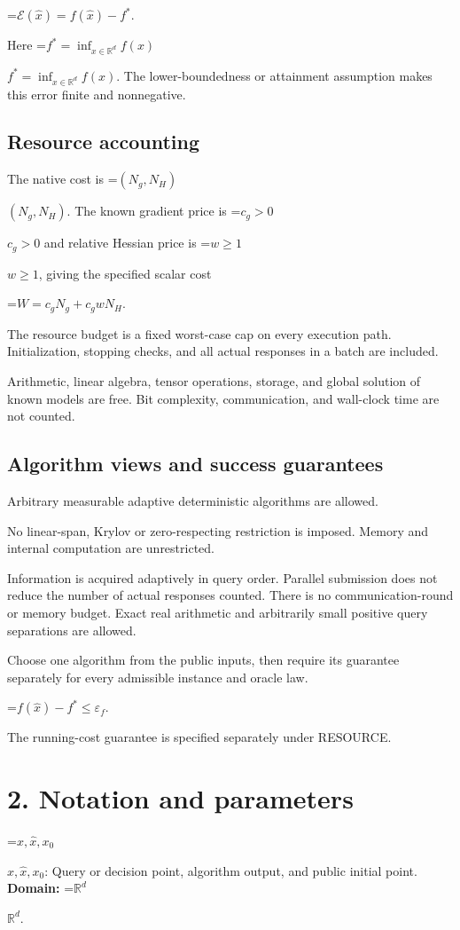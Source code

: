 \documentclass[10pt,a4paper]{article}
\newcommand{\AtlasMath}[1]{\par\begingroup\centering\setbox0=\hbox{$\displaystyle #1$}\ifdim\wd0>1.4\linewidth\typeout{ATLAS WIDE FORMULA: \the\wd0}\fi\ifdim\wd0>\linewidth\resizebox{\linewidth}{!}{\box0}\else\box0\fi\par\endgroup}
\newcommand{\AtlasInlineMath}[1]{\begingroup\setbox0=\hbox{$#1$}\ifdim\wd0>.4\linewidth\endgroup\AtlasMath{#1}\else\endgroup$#1$\fi}
\begin{document}
\AtlasMath{\mathcal{E}(\widehat{x})=f(\widehat{x})-f^*.}


Here \AtlasInlineMath{f^*=\inf_{x\in \mathbb{R}^d}f(x)}. The lower-boundedness or attainment assumption makes this error finite and nonnegative.

\subsection{Resource accounting}
The native cost is \AtlasInlineMath{(N_g,N_H)}. The known gradient price is \AtlasInlineMath{c_g>0} and relative Hessian price is \AtlasInlineMath{w\ge1}, giving the specified scalar cost


\AtlasMath{W=c_gN_g+c_gwN_H.}


The resource budget is a fixed worst-case cap on every execution path. Initialization, stopping checks, and all actual responses in a batch are included.

Arithmetic, linear algebra, tensor operations, storage, and global solution of known models are free. Bit complexity, communication, and wall-clock time are not counted.

\subsection{Algorithm views and success guarantees}
Arbitrary measurable adaptive deterministic algorithms are allowed.

No linear-span, Krylov or zero-respecting restriction is imposed. Memory and internal computation are unrestricted.

Information is acquired adaptively in query order. Parallel submission does not reduce the number of actual responses counted. There is no communication-round or memory budget. Exact real arithmetic and arbitrarily small positive query separations are allowed.

Choose one algorithm from the public inputs, then require its guarantee separately for every admissible instance and oracle law.


\AtlasMath{f(\widehat{x})-f^*\le \varepsilon_f.}


The running-cost guarantee is specified separately under RESOURCE.

\section{2. Notation and parameters}
\AtlasInlineMath{x,\widehat{x},x_0}: Query or decision point, algorithm output, and public initial point. \textbf{Domain:} \AtlasInlineMath{\mathbb{R}^d}.
\end{document}
